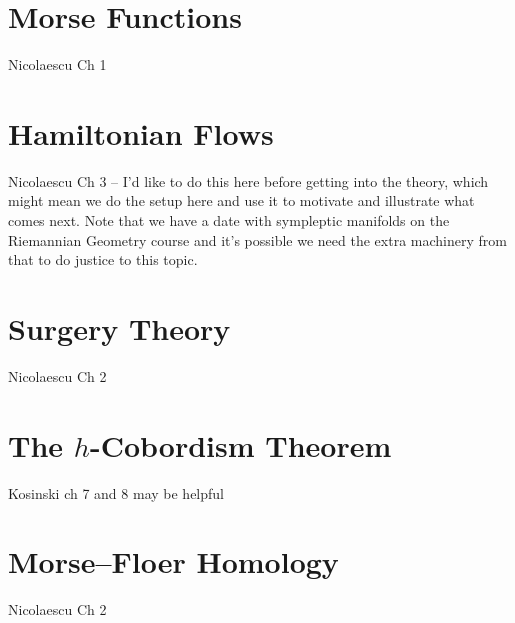 \documentclass[oneside,english]{amsbook}
\numberwithin{section}{chapter}
\theoremstyle{plain}
\theoremstyle{definition}
\begin{document}
	\chapter{Morse Functions}
		Nicolaescu Ch 1
	
	\chapter{Hamiltonian Flows}
		Nicolaescu Ch 3 -- I'd like to do this here before getting into the theory, which might mean we do the setup here and use it to motivate and illustrate what comes next. Note that we have a date with sympleptic manifolds on the Riemannian Geometry course and it's possible we need the extra machinery from that to do justice to this topic.

	\chapter{Surgery Theory}
		Nicolaescu Ch 2
	
	\chapter{The $h$-Cobordism Theorem}
		Kosinski ch 7 and 8 may be helpful

	\chapter{Morse–Floer Homology}
		Nicolaescu Ch 2
\end{document}
